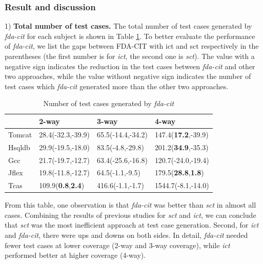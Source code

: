 \documentclass[journal,12pt,onecolumn,draftclsnofoot,]{IEEEtran}
\begin{document}

\subsubsection{Result and discussion}

1) \textbf{Total number of test cases.}
The total number of test cases generated by \emph{fda-cit} for each subject is shown in Table \ref{num-fda-cit}. To better evaluate the performance of \emph{fda-cit}, we list the gaps between FDA-CIT with ict and sct respectively in the parentheses (the first number is for \emph{ict}, the second one is \emph{sct}). The value with a negative sign indicates the reduction in the test cases between \emph{fda-cit} and other two approaches, while the value without negative sign indicates the number of test cases which \emph{fda-cit} generated more than the other two approaches.

\begin{table}[ht]
\caption{Number of test cases generated by \emph{fda-cit}}
\label{num-fda-cit}
\centering
    \begin{tabular}{|l|l|l|l|}
    \hline
    ~      & 2-way                     & 3-way                     & 4-way                       \\ \hline
Tomcat	&28.4(-32.3,-39.9)	&65.5(-14.4,-34.2)	&147.4(\textbf{17.2},-39.9)	\\
Hsqldb	&29.9(-19.5,-18.0)	&83.5(-4.8,-29.8)	&201.2(\textbf{34.9},-35.3)	\\
Gcc	&21.7(-19.7,-12.7)	&63.4(-25.6,-16.8)	&120.7(-24.0,-19.4)	\\
Jflex	&19.8(-11.8,-12.7)	&64.5(-1.1,-9.5)	&179.5(\textbf{28.8},\textbf{1.8})	\\
Tcas	&109.9(\textbf{0.8},\textbf{2.4})	&416.6(-1.1,-1.7)	&1544.7(-8.1,-14.0)	\\\hline
    \end{tabular}
\end{table}

From this table, one observation is that \emph{fda-cit} was better than \emph{sct} in almost all cases. Combining the results of previous studies for \emph{sct} and \emph{ict}, we can conclude that \emph{sct} was the most inefficient approach at test case generation. Second, for \emph{ict} and \emph{fda-cit}, there were ups and downs on both sides. In detail, \emph{fda-cit} needed fewer test cases at lower coverage (2-way  and 3-way coverage), while \emph{ict} performed better at higher coverage (4-way).
\end{document}
